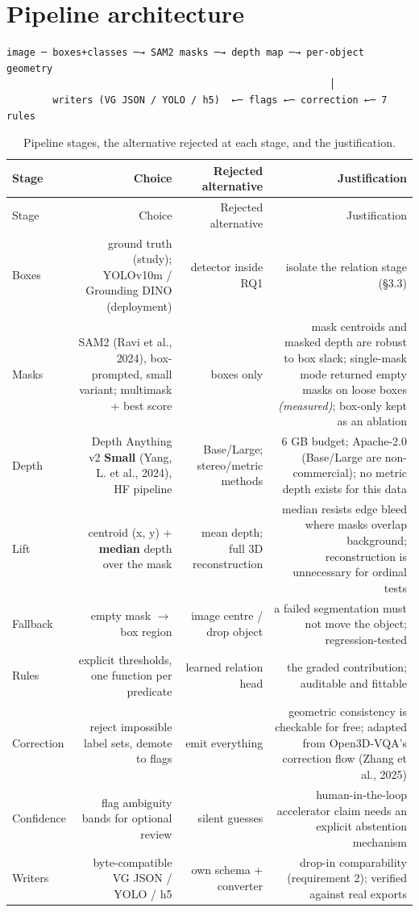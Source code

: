 \section{Pipeline architecture}

\begin{verbatim}
image ─ boxes+classes ─→ SAM2 masks ─→ depth map ─→ per-object geometry
                                                        │
        writers (VG JSON / YOLO / h5)  ←─ flags ←─ correction ←─ 7 rules
\end{verbatim}

\begin{center}
\small
\begin{longtable}{lrrr}
\caption{Pipeline stages, the alternative rejected at each stage, and the justification.}\\
\hline
Stage & Choice & Rejected alternative & Justification \\
\hline
\endfirsthead
\hline
Stage & Choice & Rejected alternative & Justification \\
\hline
\endhead
Boxes & ground truth (study); YOLOv10m / Grounding DINO (deployment) & detector inside RQ1 & isolate the relation stage (\S3.3) \\
Masks & SAM2 (Ravi et al., 2024), box-prompted, small variant; multimask + best score & boxes only & mask centroids and masked depth are robust to box slack; single-mask mode returned empty masks on loose boxes \textit{(measured)}; box-only kept as an ablation \\
Depth & Depth Anything v2 \textbf{Small} (Yang, L. et al., 2024), HF pipeline & Base/Large; stereo/metric methods & 6 GB budget; Apache-2.0 (Base/Large are non-commercial); no metric depth exists for this data \\
Lift & centroid (x, y) + \textbf{median} depth over the mask & mean depth; full 3D reconstruction & median resists edge bleed where masks overlap background; reconstruction is unnecessary for ordinal tests \\
Fallback & empty mask $\rightarrow$ box region & image centre / drop object & a failed segmentation must not move the object; regression-tested \\
Rules & explicit thresholds, one function per predicate & learned relation head & the graded contribution; auditable and fittable \\
Correction & reject impossible label sets, demote to flags & emit everything & geometric consistency is checkable for free; adapted from Open3D-VQA's correction flow (Zhang et al., 2025) \\
Confidence & flag ambiguity bands for optional review & silent guesses & human-in-the-loop accelerator claim needs an explicit abstention mechanism \\
Writers & byte-compatible VG JSON / YOLO / h5 & own schema + converter & drop-in comparability (requirement 2); verified against real exports \\
\hline
\end{longtable}
\end{center}

